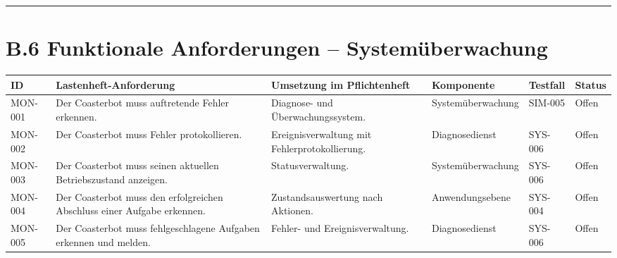 \documentclass[
]{article}
\begin{document}
\begin{center}\rule{0.5\linewidth}{0.5pt}\end{center}

\section{B.6 Funktionale Anforderungen --
Systemüberwachung}\label{b.6-funktionale-anforderungen-systemuxfcberwachung}

\begin{longtable}[]{@{}
  >{\raggedright\arraybackslash}p{}
  >{\raggedright\arraybackslash}p{}
  >{\raggedright\arraybackslash}p{}
  >{\raggedright\arraybackslash}p{}
  >{\raggedright\arraybackslash}p{}
  >{\raggedright\arraybackslash}p{}@{}}
\toprule\noalign{}
\begin{minipage}[b]{\linewidth}\raggedright
ID
\end{minipage} & \begin{minipage}[b]{\linewidth}\raggedright
Lastenheft-Anforderung
\end{minipage} & \begin{minipage}[b]{\linewidth}\raggedright
Umsetzung im Pflichtenheft
\end{minipage} & \begin{minipage}[b]{\linewidth}\raggedright
Komponente
\end{minipage} & \begin{minipage}[b]{\linewidth}\raggedright
Testfall
\end{minipage} & \begin{minipage}[b]{\linewidth}\raggedright
Status
\end{minipage} \\
\midrule\noalign{}
\endhead
\bottomrule\noalign{}
\endlastfoot
MON-001 & Der Coasterbot muss auftretende Fehler erkennen. & Diagnose-
und Überwachungssystem. & Systemüberwachung & SIM-005 & Offen \\
MON-002 & Der Coasterbot muss Fehler protokollieren. &
Ereignisverwaltung mit Fehlerprotokollierung. & Diagnosedienst & SYS-006
& Offen \\
MON-003 & Der Coasterbot muss seinen aktuellen Betriebszustand anzeigen.
& Statusverwaltung. & Systemüberwachung & SYS-006 & Offen \\
MON-004 & Der Coasterbot muss den erfolgreichen Abschluss einer Aufgabe
erkennen. & Zustandsauswertung nach Aktionen. & Anwendungsebene &
SYS-004 & Offen \\
MON-005 & Der Coasterbot muss fehlgeschlagene Aufgaben erkennen und
melden. & Fehler- und Ereignisverwaltung. & Diagnosedienst & SYS-006 &
Offen \\
\end{longtable}
\end{document}
